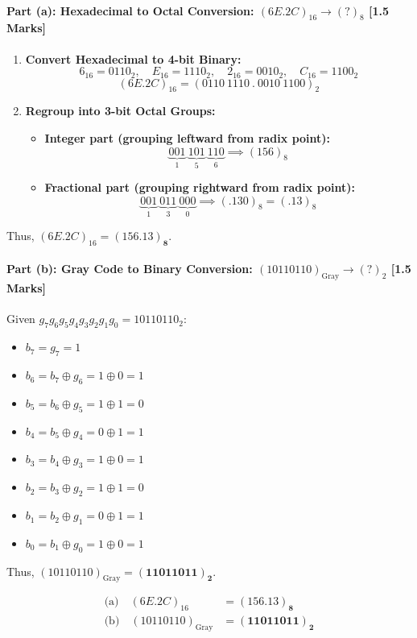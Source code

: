 \documentclass[11pt,a4paper,oneside]{book}
\begin{document}
\paragraph{Part (a): Hexadecimal to Octal Conversion: $(6E.2C)_{16} \to (?)_{8}$ [1.5 Marks]}
\begin{enumerate}
  \item \textbf{Convert Hexadecimal to 4-bit Binary:}
  \[
  6_{16} = 0110_2, \quad E_{16} = 1110_2, \quad 2_{16} = 0010_2, \quad C_{16} = 1100_2
  \]
  \[
  (6E.2C)_{16} = (0110\ 1110\ .\ 0010\ 1100)_2
  \]
  \item \textbf{Regroup into 3-bit Octal Groups:}
  \begin{itemize}
    \item \textbf{Integer part (grouping leftward from radix point):}
    \[
    \underbrace{001}_{1}\ \underbrace{101}_{5}\ \underbrace{110}_{6} \implies (156)_8
    \]
    \item \textbf{Fractional part (grouping rightward from radix point):}
    \[
    \underbrace{001}_{1}\ \underbrace{011}_{3}\ \underbrace{000}_{0} \implies (.130)_8 = (.13)_8
    \]
  \end{itemize}
\end{enumerate}
Thus, $(6E.2C)_{16} = \mathbf{(156.13)_8}$.

\paragraph{Part (b): Gray Code to Binary Conversion: $(10110110)_{\text{Gray}} \to (?)_{2}$ [1.5 Marks]}
Given $g_7 g_6 g_5 g_4 g_3 g_2 g_1 g_0 = 10110110_2$:
\begin{itemize}
  \item $b_7 = g_7 = 1$
  \item $b_6 = b_7 \oplus g_6 = 1 \oplus 0 = 1$
  \item $b_5 = b_6 \oplus g_5 = 1 \oplus 1 = 0$
  \item $b_4 = b_5 \oplus g_4 = 0 \oplus 1 = 1$
  \item $b_3 = b_4 \oplus g_3 = 1 \oplus 0 = 1$
  \item $b_2 = b_3 \oplus g_2 = 1 \oplus 1 = 0$
  \item $b_1 = b_2 \oplus g_1 = 0 \oplus 1 = 1$
  \item $b_0 = b_1 \oplus g_0 = 1 \oplus 0 = 1$
\end{itemize}
Thus, $(10110110)_{\text{Gray}} = \mathbf{(11011011)_2}$.

\begin{answerbox}
\begin{align*}
\text{(a)}\quad (6E.2C)_{16} &= \mathbf{(156.13)_8} \\
\text{(b)}\quad (10110110)_{\text{Gray}} &= \mathbf{(11011011)_2}
\end{align*}
\end{answerbox}
\end{document}
